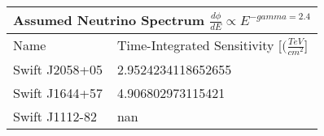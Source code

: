 \documentclass[]{article}
\begin{document}
\begin{tabular}{ |p{3.5cm}||p{4.5cm}|} 
\hline 
\multicolumn{2}{|c|}{Assumed Neutrino Spectrum $ \frac {d \phi}{dE} \propto E ^ {-gamma=2.4} $} \\ 
\hline 
Name&Time-Integrated Sensitivity [$ (\frac{TeV}{cm^{2}} $] \\ 
\hline 
Swift J2058+05 & \num[round-precision=2, round-mode=figures, scientific-notation=true]{2.9524234118652655}  \\ 
Swift J1644+57 & \num[round-precision=2, round-mode=figures, scientific-notation=true]{4.906802973115421}  \\ 
Swift J1112-82 & \num[round-precision=2, round-mode=figures, scientific-notation=true]{nan}  \\ 
\hline 
\end{tabular} 
\end{document}
